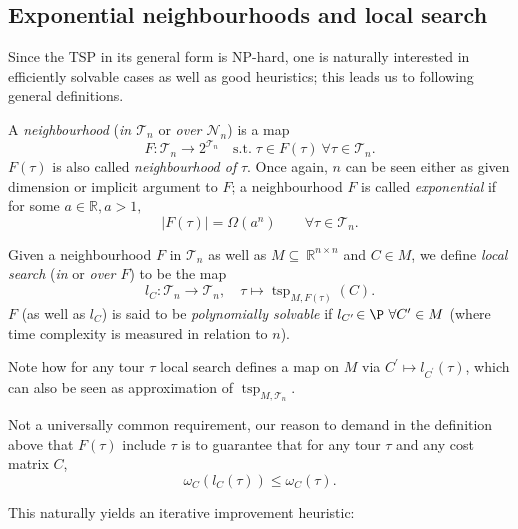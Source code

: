 \documentclass[titlepage,twoside,index=totoc,bibliography=totoc]{scrartcl}
\numberwithin{equation}{section}
\numberwithin{figure}{section}
\numberwithin{table}{section}
\let\defstyle\itshape
\begin{document}
\subsection{Exponential neighbourhoods and local search}

Since the TSP in its general form is NP-hard, one is naturally interested
in efficiently solvable cases as well as good heuristics; this leads us to
following general definitions.

\begin{define}
  A {\defstyle neighbourhood}
  ({\defstyle in $\mathcal{T}_n$} or {\defstyle over $\mathcal{N}_n$}) is a map
  \[
    F: \mathcal{T}_n \to 2^{\mathcal{T}_n}
    \quad \text{s.t.}\; \tau \in F\left(\tau\right) \ \forall \tau \in \mathcal{T}_n.
  \]
  $F(\tau)$ is also called {\defstyle neighbourhood of} $\tau$.
  Once again, $n$ can be seen either as given dimension or implicit
  argument to $F$; a neighbourhood $F$ is called {\defstyle exponential} if
  for some $a \in \mathbb{R}, a > 1,$
  \[
    \left\vert F(\tau) \right\vert = \Omega(a^n) \qquad \forall \tau \in \mathcal{T}_n.
  \]
\end{define}

\begin{define}
  Given a neighbourhood $F$ in $\mathcal{T}_n$
  as well as $M \subseteq~\mathbb{R}^{n \times n}$ and $C \in M$,
  we define {\defstyle local search}
  ({\defstyle in} or {\defstyle over $F$}) to be the map
  \[
    l_C :
    \mathcal{T}_n \to \mathcal{T}_n, \quad
    \tau \mapsto \operatorname{tsp}_{M,F(\tau)}\left(C\right).
  \]
  $F$ (as well as $l_C$) is said to be {\defstyle polynomially solvable} if
  $l_{C^\prime}\!\in \P \ \forall C^\prime \in M$
  (where time complexity is measured in relation to $n$).
\end{define}

Note how for any tour $\tau$ local search defines a map on $M$ via
$C^\prime \mapsto l_{C^\prime}\left(\tau\right)$, which can also be seen as
approximation of $\operatorname{tsp}_{M,\mathcal{T}_n}$.

\begin{remark}
  Not a universally common requirement, our reason to demand in the
  definition above that
  $F\left(\tau\right)$ include $\tau$ is to guarantee
  that for any tour $\tau$ and any cost matrix $C$,
  \[
    \omega_C\left(l_C\left(\tau\right)\right) \leq \omega_C\left(\tau\right).
  \]
\end{remark}
This naturally yields an iterative improvement heuristic:
\end{document}
